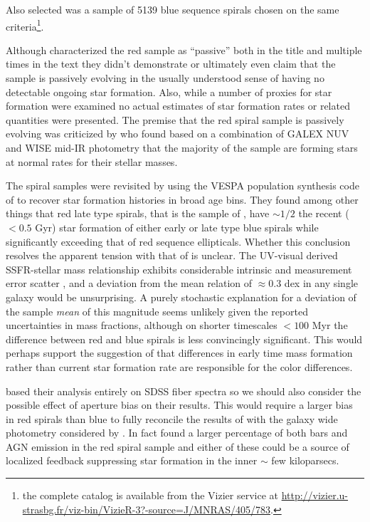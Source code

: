 \documentclass[modern]{aastex62}
\begin{document}
Also selected was a sample of 5139 blue sequence spirals chosen on the same criteria\footnote{the complete catalog is available from the Vizier service at \url{http://vizier.u-strasbg.fr/viz-bin/VizieR-3?-source=J/MNRAS/405/783}.}.

Although  characterized the red sample as ``passive'' both in the title and multiple times in the text they didn't demonstrate or ultimately even claim that the sample is passively evolving in the usually understood sense of having no detectable ongoing star formation. Also, while a number of proxies for star formation were examined no actual estimates of star formation rates or related quantities were presented. The premise that the red spiral sample is passively evolving was criticized by \citet[][C12]{2012A&A...543A.132C} who found based on a combination of GALEX NUV and WISE mid-IR photometry that the majority of the sample are forming stars at normal rates for their stellar masses.

The spiral samples were revisited by \citet[][T13]{2013MNRAS.432..359T} using the VESPA population synthesis code of \citet{2007MNRAS.381.1252T, 2009ApJS..185....1T} to recover star formation histories in broad age bins. They found among other things that red late type spirals, that is the sample of , have $\sim 1/2$ the recent ($< 0.5$ Gyr) star formation of either early or late type blue spirals while significantly exceeding that of red sequence ellipticals. Whether this conclusion resolves the apparent tension with that of  is unclear. The UV-visual derived SSFR-stellar mass relationship exhibits considerable intrinsic and measurement error scatter \citep{2007ApJS..173..267S}, and a deviation from the mean relation of $\approx 0.3$ dex in any single galaxy would be unsurprising. A purely stochastic explanation for a deviation of the sample \emph{mean} of this magnitude seems unlikely given the reported uncertainties in mass fractions, although on shorter timescales $< 100$ Myr the difference between red and blue spirals is less convincingly significant. This would perhaps support the suggestion of  that differences in early time mass formation rather than current star formation rate are responsible for the color differences.

 based their analysis entirely on SDSS fiber spectra so we should also consider the possible effect of aperture bias \citep{2005PASP..117..227K} on their results. This would require a larger bias in red spirals than blue to fully reconcile the results of  with the galaxy wide photometry considered by . In fact  found a larger percentage of both bars and AGN emission in the red spiral sample and either of these could be a source of localized feedback suppressing star formation in the inner $\sim$ few kiloparsecs.
\end{document}

